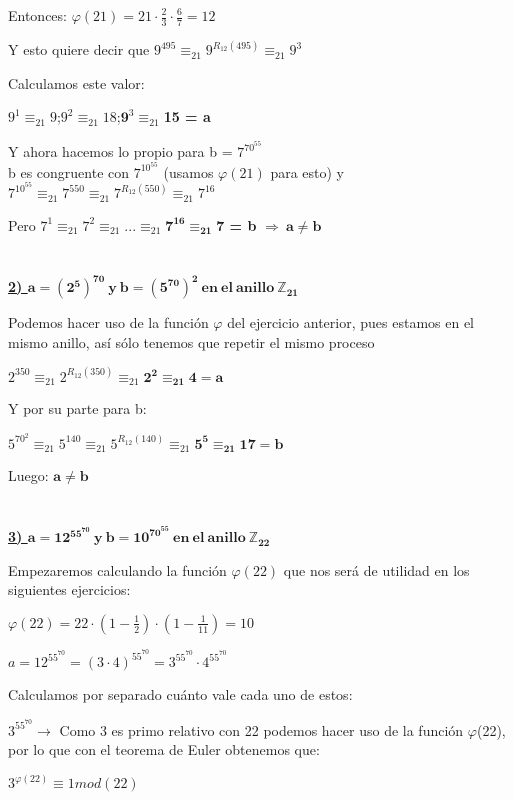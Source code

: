 \documentclass[11pt, a4paper, titlepage]{article}
\providecommand{\ent}{\mathbb{Z}}
\begin{document}
Entonces: $\varphi(21) = 21\cdot\frac{2}{3}\cdot\frac{6}{7} = 12$

Y esto quiere decir que $9^{495} \equiv_{21} 9^{R_{12}(495)}\equiv_{21}9^3 $

Calculamos este valor:

$9^1\equiv_{21}9$\quad;\quad$9^2\equiv_{21}18$\quad;\quad$\mathbf9^3\equiv_{21}$\textbf{15 = a}

Y ahora hacemos lo propio para b = $7^{70^{55}}$
\\ b es congruente con $7^{10^{55}}$ (usamos $\varphi(21)$ para esto)
y $7^{10^{55}}\equiv_{21}7^{550}\equiv_{21}7^{R_{12}(550)}\equiv_{21}7^{16}$

Pero $7^1\equiv_{21}7^2\equiv_{21}...\equiv_{21}\mathbf7^{\mathbf{16}}\equiv_{\mathbf{21}}$\textbf{7 = b} $\Rightarrow\ \mathbf{a \neq b}$
\\\\\\
\textbf{\underline{2) $\mathbf{a = (2^{5})^{70}\ y\ b = (5^{70})^{2}\ en\ el\ anillo\ \ent_{21} }$}}

Podemos hacer uso de la función $\varphi$ del ejercicio anterior, pues estamos en el mismo anillo, así sólo tenemos que repetir el mismo proceso

$2^{350}\equiv_{21}2^{R_{12}(350)}\equiv_{21}\mathbf{2^2\equiv_{21}4 = a}$

Y por su parte para b:

$5^{70^2} \equiv_{21} 5^{140} \equiv_{21} 5^{R_{12}(140)} \equiv_{21} \mathbf{5^5 \equiv_{21}17 = b} $

Luego: $\mathbf{a \neq b}$
\\\\\\
\textbf{\underline{3) $\mathbf{a = 12^{55^{70}}\ y\ b = 10^{70^{55}}\ en\ el\ anillo\ \ent_{22} }$}}

Empezaremos calculando la función $\varphi(22)$ que nos será de utilidad en los siguientes ejercicios:

$\varphi(22) = 22\cdot(1-\frac{1}{2})\cdot(1-\frac{1}{11}) = 10$

$a = 12^{55^{70}} = (3\cdot 4)^{55^{70}} = 3^{55^{70}} \cdot 4^{55^{70}}$

Calculamos por separado cuánto vale cada uno de estos:

$3^{55^{70}} \rightarrow$ Como 3 es primo relativo con 22 podemos hacer uso de la función $\varphi$(22), por lo que con el teorema de Euler obtenemos que:

$3^{\varphi(22)}\equiv 1mod(22)$
\end{document}
